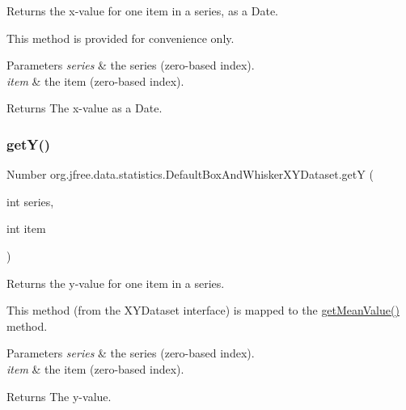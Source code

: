 Returns the x-\/value for one item in a series, as a Date. 

This method is provided for convenience only.


\begin{DoxyParams}{Parameters}
{\em series} & the series (zero-\/based index). \\
\hline
{\em item} & the item (zero-\/based index).\\
\hline
\end{DoxyParams}
\begin{DoxyReturn}{Returns}
The x-\/value as a Date. 
\end{DoxyReturn}
\mbox{\label{classorg_1_1jfree_1_1data_1_1statistics_1_1_default_box_and_whisker_x_y_dataset_a6b5b403d1094947c415cbea649904128}} 
\subsubsection{\texorpdfstring{get\+Y()}{getY()}}
{\footnotesize\ttfamily Number org.\+jfree.\+data.\+statistics.\+Default\+Box\+And\+Whisker\+X\+Y\+Dataset.\+getY (\begin{DoxyParamCaption}\item[{int}]{series,  }\item[{int}]{item }\end{DoxyParamCaption})}

Returns the y-\/value for one item in a series. 

This method (from the X\+Y\+Dataset interface) is mapped to the \mbox{\hyperlink{classorg_1_1jfree_1_1data_1_1statistics_1_1_default_box_and_whisker_x_y_dataset_a304903af30ed69f64ecad290fbfef916}{get\+Mean\+Value()}} method.


\begin{DoxyParams}{Parameters}
{\em series} & the series (zero-\/based index). \\
\hline
{\em item} & the item (zero-\/based index).\\
\hline
\end{DoxyParams}
\begin{DoxyReturn}{Returns}
The y-\/value. 
\end{DoxyReturn}


